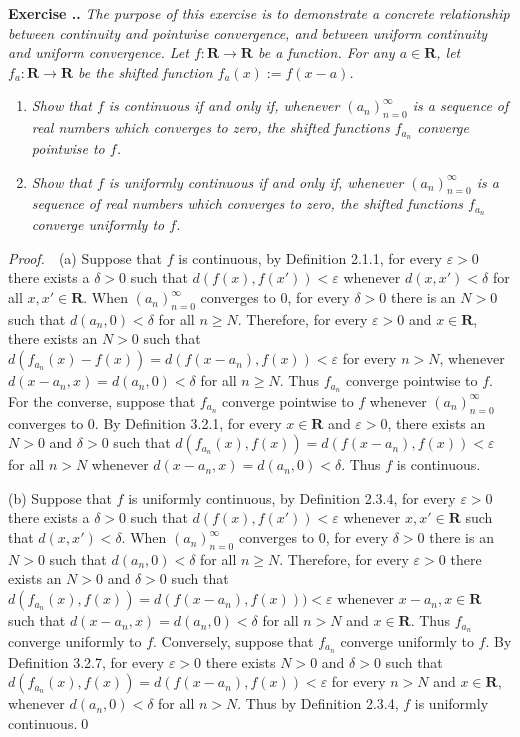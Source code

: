 \documentclass{book}
\newcommand{\pff}{\vspace{.25em}\noindent\emph{Proof.}~~}
\newcounter{Exercise}[section]
\renewcommand{\theExercise}{\thesection.\arabic{Exercise}.}
\newcommand{\new}{\vspace{1.5em}\noindent\textbf{Exercise \stepcounter{Exercise}\textbf{\theExercise}} }
\begin{document}
\new\emph{The purpose of this exercise is to demonstrate a concrete relationship between continuity and pointwise convergence, and between uniform continuity and uniform convergence. Let $f:\mathbf{R}\to\mathbf{R}$ be a function. For any $a\in\mathbf{R}$, let $f_a:\mathbf{R}\to\mathbf{R}$ be the shifted function $f_a(x):=f(x-a)$.}
\begin{enumerate}
    \item \emph{Show that $f$ is continuous if and only if, whenever $(a_n)_{n=0}^{\infty}$ is a sequence of real numbers which converges to zero, the shifted functions $f_{a_n}$ converge pointwise to $f$.}
    \item \emph{Show that $f$ is uniformly continuous if and only if, whenever $(a_n)_{n=0}^{\infty}$ is a sequence of real numbers which converges to zero, the shifted functions $f_{a_n}$ converge uniformly to $f$.}
\end{enumerate}

\pff (a) Suppose that $f$ is continuous, by Definition 2.1.1, for every $\varepsilon>0$ there exists a $\delta>0$ such that $d(f(x),f(x'))<\varepsilon$ whenever $d(x,x')<\delta$ for all $x,x'\in\mathbf{R}$. When $(a_n)_{n=0}^{\infty}$ converges to $0$, for every $\delta>0$ there is an $N>0$ such that $d(a_n,0)<\delta$ for all $n\geq N$. Therefore, for every $\varepsilon>0$ and $x\in\mathbf{R}$, there exists an $N>0$ such that $d(f_{a_n}(x)-f(x))=d(f(x-a_n),f(x))<\varepsilon$ for every $n>N$, whenever $d(x-a_n,x)=d(a_n,0)<\delta$ for all $n\geq N$. Thus $f_{a_n}$ converge pointwise to $f$. For the converse, suppose that $f_{a_n}$ converge pointwise to $f$ whenever $(a_n)_{n=0}^{\infty}$ converges to $0$. By Definition 3.2.1, for every $x\in\mathbf{R}$ and $\varepsilon>0$, there exists an $N>0$ and $\delta>0$ such that $d(f_{a_n}(x),f(x))=d(f(x-a_n),f(x))<\varepsilon$ for all $n>N$ whenever $d(x-a_n,x)=d(a_n,0)<\delta$. Thus $f$ is continuous.

(b) Suppose that $f$ is uniformly continuous, by Definition 2.3.4, for every $\varepsilon>0$ there exists a $\delta>0$ such that $d(f(x),f(x'))<\varepsilon$ whenever $x,x'\in\mathbf{R}$ such that $d(x,x')<\delta$. When $(a_n)_{n=0}^{\infty}$ converges to $0$, for every $\delta>0$ there is an $N>0$ such that $d(a_n,0)<\delta$ for all $n\geq N$. Therefore, for every $\varepsilon>0$ there exists an $N>0$ and $\delta>0$ such that $d(f_{a_n}(x),f(x))=d(f(x-a_n),f(x)))<\varepsilon$ whenever $x-a_n,x\in\mathbf{R}$ such that $d(x-a_n,x)=d(a_n,0)<\delta$ for all $n>N$ and $x\in\mathbf{R}$. Thus $f_{a_n}$ converge uniformly to $f$. Conversely, suppose that $f_{a_n}$ converge uniformly to $f$. By Definition 3.2.7, for every $\varepsilon>0$ there exists $N>0$ and $\delta>0$ such that $d(f_{a_n}(x),f(x))=d(f(x-a_n),f(x))<\varepsilon$ for every $n>N$ and $x\in\mathbf{R}$, whenever $d(a_n,0)<\delta$ for all $n>N$. Thus by Definition 2.3.4, $f$ is uniformly continuous.\qed
\end{document}
